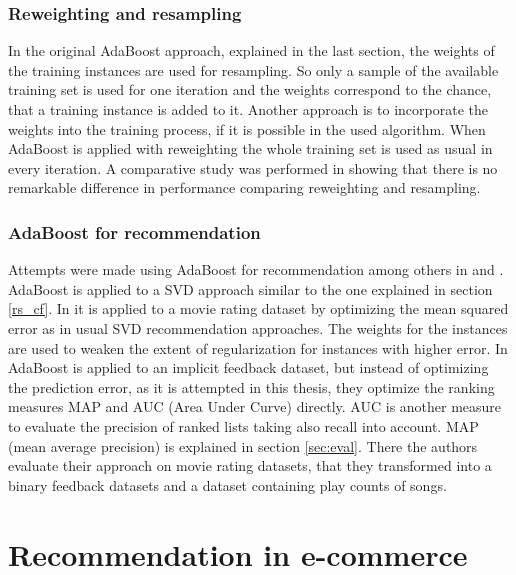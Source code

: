 \documentclass[10pt]{reportMaster}
\begin{document}
\subsection*{Reweighting and resampling}
\label{sec:reweightingResampling}
In the original AdaBoost approach, explained in the last section, the weights of the training instances are used for resampling.
So only a sample of the available training set is used for one iteration and the weights correspond to the chance, that a training instance is added to it.
Another approach is to incorporate the weights into the training process, if it is possible in the used algorithm.
When AdaBoost is applied with reweighting the whole training set is used as usual in every iteration.
A comparative study was performed in \cite{resamplingReweighting} showing that there is no remarkable difference in performance comparing reweighting and resampling.


\subsection*{AdaBoost for recommendation}
\label{sec:adaBoostForRecommendation}
Attempts were made using AdaBoost for recommendation among others in \cite{boostingCFRatings} and \cite{boostingAUC}.
AdaBoost is applied to a SVD approach similar to the one explained in section \ref{rs_cf}.
In \cite{boostingCFRatings} it is applied to a movie rating dataset by optimizing the mean squared error as in usual SVD recommendation approaches.
The weights for the instances are used to weaken the extent of regularization for instances with higher error.
In \cite{boostingAUC} AdaBoost is applied to an implicit feedback dataset, but instead of optimizing the prediction error, as it is attempted in this thesis, they optimize the ranking measures MAP and AUC (Area Under Curve) directly.
AUC is another measure to evaluate the precision of ranked lists taking also recall into account.
MAP (mean average precision) is explained in section \ref{sec:eval}.
There the authors evaluate their approach on movie rating datasets, that they transformed into a binary feedback datasets and a dataset containing play counts of songs.











\chapter{Recommendation in e-commerce}
\label{sec:ecommerceRec}
\end{document}

